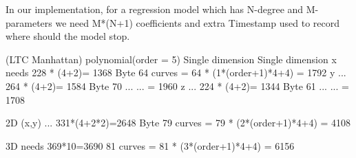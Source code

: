 \documentclass{report}
\begin{document}
In our implementation, for a regression model which has N-degree and M-parameters we need M*(N+1) coefficients and extra Timestamp used to record where should the model stop.

(LTC Manhattan)                     polynomial(order = 5)
Single dimension                    Single dimension
x needs 228 * (4+2)= 1368 Byte     64 curves = 64 * (1*(order+1)*4+4) = 1792
y  ...  264 * (4+2)= 1584 Byte     70 ...    ...  = 1960
z  ...  224 * (4+2)= 1344 Byte     61 ...    ...  = 1708

2D
(x,y) ... 331*(4+2*2)=2648 Byte    79 curves = 79 * (2*(order+1)*4+4) = 4108

3D
     needs 369*10=3690             81 curves = 81 * (3*(order+1)*4+4) = 6156

%
%



\end{document}
